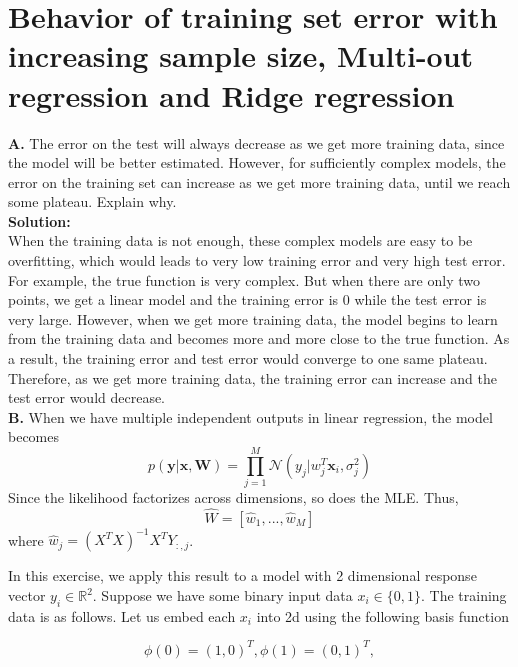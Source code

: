 \documentclass{article}
\begin{document}
\newpage
\section{Behavior of training set error with increasing sample size, Multi-out regression and Ridge regression}
\textbf{A. } The error on the test will always decrease as we get more training data, since the model will be better estimated. However, for sufficiently complex models, the error on the training set can increase as we get more training data, until we reach some plateau. Explain why.
\\
\textbf{Solution:}\\
When the training data is not enough, these complex models are easy to be overfitting, which would leads to very low training error and very high test error. \\
For example, the true function is very complex. But when there are only two points, we get a linear model and the training error is 0 while the test error is very large. However, when we get more training data, the model begins to learn from the training data and becomes more and more close to the true function. As a result, the training error and test error would converge to one same plateau. Therefore, as we get more training data, the training error can increase and the test error would decrease.
\\
\textbf{B. } When we have multiple independent outputs in linear regression, the model becomes
\begin{equation}
    p(\mathbf{y}|\mathbf{x}, \mathbf{W}) = \prod_{j=1}^{M} \mathcal{N}(y_{j}|w_{j}^{T}\mathbf{x}_{i},\sigma_{j}^{2})
\end{equation}
Since the likelihood factorizes across dimensions, so does the MLE. Thus,
\begin{equation}
    \hat{W} = [\hat{w}_{1},...,\hat{w}_{M}]
\end{equation}
where $\hat{w}_{j} = (X^{T}X)^{-1}X^{T} Y_{:,j}$.

In this exercise, we apply this result to a model with 2 dimensional response vector $y_{i} \in \mathbb{R}^2$. Suppose we have some binary input data $x_{i} \in \{0,1\}$. The training data is as follows. Let us embed each $x_{i}$ into 2d using the following basis function

\begin{equation}
    \phi(0) = (1,0)^{T}, \phi(1) = (0,1)^{T},
\end{equation}
\end{document}
